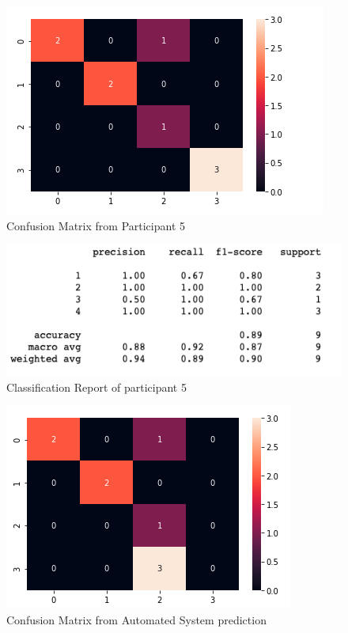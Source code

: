 \begin{figure}[!htp]
    \includegraphics[width=\textwidth]{Images/p5.png}
    \caption{Confusion Matrix from Participant 5}
    \label{fig:f11}
\end{figure}

\begin{figure}[!htp]
    \includegraphics[width=\textwidth]{Images/p5r.png}
    \caption{Classification Report of participant 5}
    \label{fig:f11}
\end{figure}

\pagebreak

\begin{figure}[!htp]
    \includegraphics[width=\textwidth]{Images/a5.png}
    \caption{Confusion Matrix from Automated System prediction}
    \label{fig:f11}
\end{figure}

